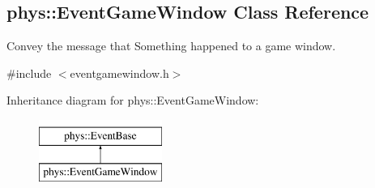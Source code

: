 \hypertarget{classphys_1_1EventGameWindow}{
\subsection{phys::EventGameWindow Class Reference}
\label{classphys_1_1EventGameWindow}
}


Convey the message that Something happened to a game window.  




{\ttfamily \#include $<$eventgamewindow.h$>$}

Inheritance diagram for phys::EventGameWindow:\begin{figure}[H]
\begin{center}
\leavevmode
\includegraphics[height=2.000000cm]{classphys_1_1EventGameWindow}
\end{center}
\end{figure}
